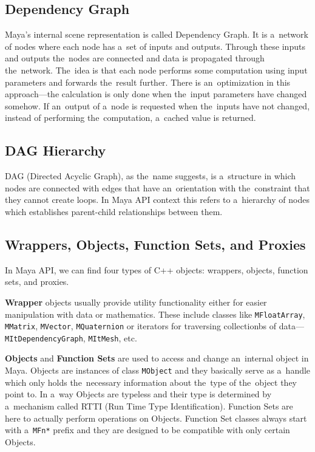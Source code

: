 \documentclass[
  digital, %
  table,   %
  nolof,     %
  nolot,     %
  oneside,
]{fithesis3}
\begin{document}
\subsection{Dependency Graph}
Maya's internal scene representation is called Dependency Graph. It is a network of nodes where each node has a set of inputs and outputs. Through these inputs and outputs the nodes are connected and data is propagated through the network. The idea is that each node performs some computation using input parameters and forwards the result further. There is an optimization in this approach—the calculation is only done when the input parameters have changed somehow. If an output of a node is requested when the inputs have not changed, instead of performing the computation, a cached value is returned.

\subsection{DAG Hierarchy}
DAG (Directed Acyclic Graph), as the name suggests, is a structure in which nodes are connected with edges that have an orientation with the constraint that they cannot create loops. In Maya API context this refers to a hierarchy of nodes which establishes parent-child relationships between them.

\subsection{Wrappers, Objects, Function Sets, and Proxies}
In Maya API, we can find four types of C++ objects: wrappers, objects, function sets, and proxies.

\textbf{Wrapper} objects usually provide utility functionality either for easier manipulation with data or mathematics. These include classes like \texttt{MFloatArray}, \texttt{MMatrix}, \texttt{MVector}, \texttt{MQuaternion} or iterators for traversing collectionbs of data—\texttt{MItDependencyGraph}, \texttt{MItMesh}, etc.

\textbf{Objects} and \textbf{Function Sets} are used to access and change an internal object in Maya. Objects are instances of class \texttt{MObject} and they basically serve as a handle which only holds the necessary information about the type of the object they point to. In a way Objects are typeless and their type is determined by a mechanism called RTTI (Run Time Type Identification). Function Sets are here to actually perform operations on Objects. Function Set classes always start with a \texttt{MFn*} prefix and they are designed to be compatible with only certain Objects.
\end{document}
